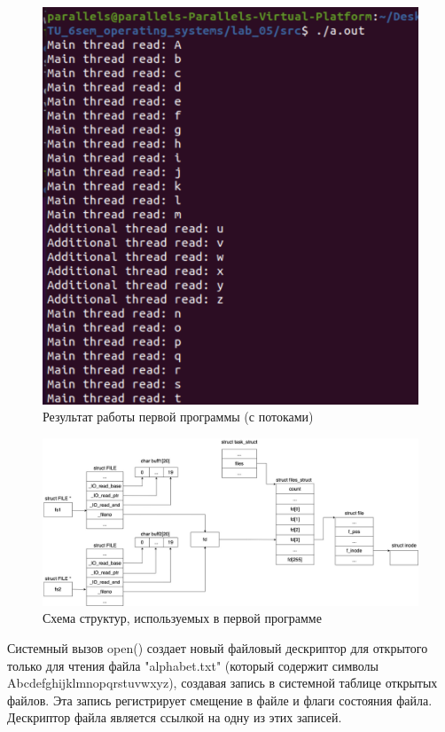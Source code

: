\documentclass[12pt]{report}
\begin{document}
\begin{figure}[H]
	\centering
	\includegraphics[scale=0.6]{img/prog_01_thread.png}
	\caption{Результат работы первой программы (с потоками)}
	\label{fig:prog_01_thread}
\end{figure}



\begin{figure}[H]
	\centering
	\includegraphics[scale=0.33]{img/prog_01_schema.jpg}
	\caption{Схема структур, используемых в первой программе}
	\label{fig:prog_01_schema}
\end{figure}

Системный вызов open() создает новый файловый дескриптор для открытого только для чтения файла "alphabet.txt" (который содержит символы Abcdefghijklmnopqrstuvwxyz), создавая запись в системной таблице открытых файлов. Эта запись регистрирует смещение в файле и флаги состояния файла. Дескриптор файла является ссылкой на одну из этих записей. 
\end{document}
